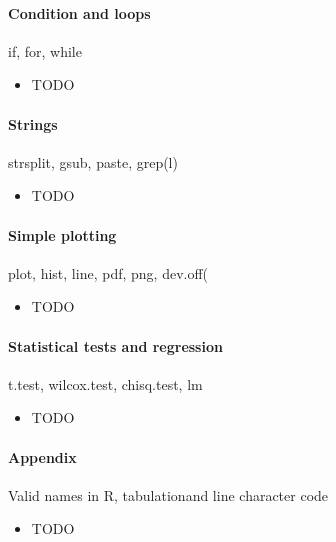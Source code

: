 \documentclass[a4paper,11pt]{article}
\begin{document}
\paragraph{Condition and loops} if, for, while
\begin{itemize} 
  \item TODO \\ 
    \verb!!
\end{itemize}


\paragraph{Strings} strsplit, gsub, paste, grep(l)
\begin{itemize} 
  \item TODO \\ 
    \verb!!
\end{itemize}

\paragraph{Simple plotting} plot, hist, line, pdf, png, dev.off(
\begin{itemize} 
  \item TODO \\ 
    \verb!!
\end{itemize}

\paragraph{Statistical tests and regression}  t.test, wilcox.test, chisq.test, lm
\begin{itemize} 
  \item TODO \\ 
    \verb!!
\end{itemize}


\paragraph{Appendix} Valid names in R, tabulationand line character code
\begin{itemize} 
  \item TODO \\ 
    \verb!!
\end{itemize}
\end{document}

